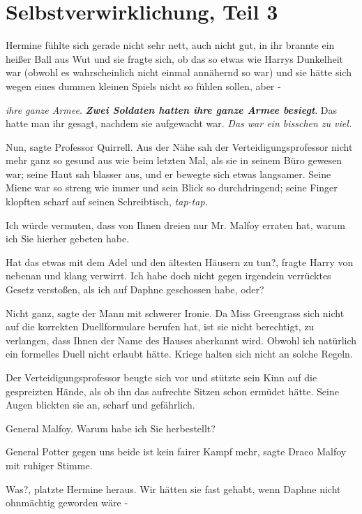 \chapter{Selbstverwirklichung, Teil 3}

Hermine fühlte sich gerade nicht sehr nett, auch nicht gut, in ihr brannte ein
heißer Ball aus Wut und sie fragte sich, ob das so etwas wie Harrys Dunkelheit
war (obwohl es wahrscheinlich nicht einmal annähernd so war) und sie hätte sich
wegen eines dummen kleinen Spiels nicht so fühlen sollen, aber -

\emph{ihre ganze Armee}. \textbf{\emph{Zwei Soldaten hatten ihre ganze Armee
besiegt}}. Das hatte man ihr gesagt, nachdem sie aufgewacht war. \emph{Das war
ein bisschen zu viel.}

\glqq Nun\grqq{}, sagte Professor Quirrell. Aus der Nähe sah der
Verteidigungsprofessor nicht mehr ganz so gesund aus wie beim letzten Mal, als
sie in seinem Büro gewesen war; seine Haut sah blasser aus, und er bewegte sich
etwas langsamer. Seine Miene war so streng wie immer und sein Blick so
durchdringend; seine Finger klopften scharf auf seinen Schreibtisch,
\emph{tap-tap.}

\glqq Ich würde vermuten, dass von Ihnen dreien nur Mr. Malfoy erraten hat,
warum ich Sie hierher gebeten habe.\grqq{}

\glqq Hat das etwas mit dem Adel und den ältesten Häusern zu tun?\grqq{}, fragte
Harry von nebenan und klang verwirrt. \glqq Ich habe doch nicht gegen irgendein
verrücktes Gesetz verstoßen, als ich auf Daphne geschossen habe, oder?\grqq{}

\glqq Nicht ganz\grqq{}, sagte der Mann mit schwerer Ironie. \glqq Da Miss
Greengrass sich nicht auf die korrekten Duellformulare berufen hat, ist sie
nicht berechtigt, zu verlangen, dass Ihnen der Name des Hauses aberkannt wird.
Obwohl ich natürlich ein formelles Duell nicht erlaubt hätte. Kriege halten sich
nicht an solche Regeln.\grqq{}

Der Verteidigungsprofessor beugte sich vor und stützte sein Kinn auf die
gespreizten Hände, als ob ihn das aufrechte Sitzen schon ermüdet hätte. Seine
Augen blickten sie an, scharf und gefährlich.

\glqq General Malfoy. Warum habe ich Sie herbestellt?\grqq{}

\glqq General Potter gegen uns beide ist kein fairer Kampf mehr\grqq{}, sagte
Draco Malfoy mit ruhiger Stimme.

\glqq Was?\grqq{}, platzte Hermine heraus. \glqq Wir hätten sie fast gehabt,
wenn Daphne nicht ohnmächtig geworden wäre -\grqq{}

